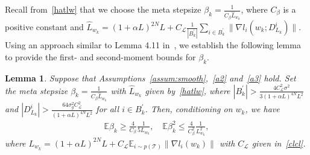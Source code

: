 \documentclass{osudissert96}
\newtheorem{lemma}{Lemma}
\begin{document}
Recall from~\cref{hatlw} that we choose the meta stepsize $\beta_k = \frac{1}{C_\beta \widehat L_{w_k}} $, where $C_\beta$ is a positive constant and { $ \widehat L_{w_k} = (1+\alpha L)^{2N}L + C_\mathcal{L} \frac{1}{|B_k^\prime|}\sum_{i\in B_k^\prime}\|\nabla l_i(w_k; D_{L_k}^i)\|$}. Using an approach similar to Lemma 4.11 in~\cite{fallah2020convergence}, we establish the following lemma to provide the first- and second-moment bounds for $\beta_k$.
%
\begin{lemma}\label{le:xiaodege} 
Suppose that  Assumptions~\ref{assum:smooth},~\ref{a2} and~\ref{a3} hold. 
	Set the meta stepsize $\beta_k = \frac{1}{C_\beta \widehat L_{w_k}} $ with  $\widehat L_{w_k}$  given by~\cref{hatlw}, where  $|B_k^\prime| > \frac{4C^2_{\mathcal{L}}\sigma^2}{3(1+\alpha L)^{4N}L^2}$ and $|D_{L_k}^i| > \frac{64\sigma^2_g C_\mathcal{L}^2}{(1+\alpha L)^{4N}L^2}$ for all $i \in B_k^\prime$. Then, conditioning on $w_k$, we have 
\begin{align*}
\mathbb{E} \beta_k  \geq  \frac{4}{C_\beta} \frac{1}{5 L_{w_k}},\quad \mathbb{E}\beta^2_k  \leq  \frac{4}{C_\beta^2} \frac{1}{L^2_{w_k}}, 
\end{align*}
where $L_{w_k} = (1+\alpha L)^{2N}L + C_\mathcal{L} \mathbb{E}_{i\sim p(\mathcal{T})}\|\nabla l_i(w_k)\|$ with  $C_\mathcal{L}$ given in~\cref{clcl}. 
\end{lemma}
\end{document}
